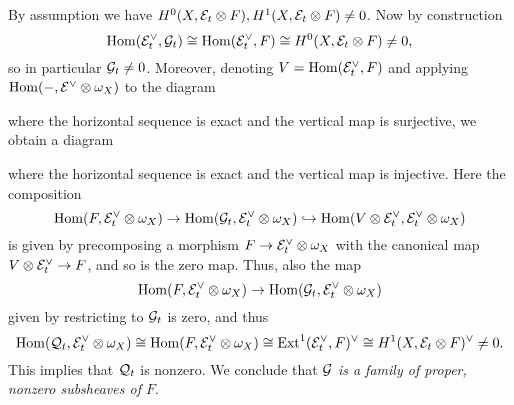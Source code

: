 \documentclass[letterpaper,10pt]{article}
\theoremstyle{remark}
\begin{document}
By assumption we have $H^0(X, \mathcal{E}_t \otimes F), H^1(X, \mathcal{E}_t \otimes F) \neq 0$. Now by construction
\[ \mathrm{Hom}(\mathcal{E}_t^\vee, \mathcal{G}_t) \cong \mathrm{Hom}(\mathcal{E}_t^\vee, F) \cong H^0(X, \mathcal{E}_t \otimes F) \neq 0, \]
so in particular $\mathcal{G}_t \neq 0$. Moreover, denoting $V = \mathrm{Hom}(\mathcal{E}_t^\vee, F)$ and applying $\mathrm{Hom}(-, \mathcal{E}^\vee \otimes \omega_X)$ to the diagram
\begin{center}
\end{center}
where the horizontal sequence is exact and the vertical map is surjective, we obtain a diagram
\begin{center}
\end{center}
where the horizontal sequence is exact and the vertical map is injective. Here the composition
\[ \mathrm{Hom}(F, \mathcal{E}_t^\vee \otimes \omega_X) \to \mathrm{Hom}(\mathcal{G}_t, \mathcal{E}_t^\vee \otimes \omega_X) \hookrightarrow \mathrm{Hom}(V \otimes \mathcal{E}_t^\vee, \mathcal{E}_t^\vee \otimes \omega_X) \]
is given by precomposing a morphism $F \to \mathcal{E}_t^\vee \otimes \omega_X$ with the canonical map $V \otimes \mathcal{E}_t^\vee \to F$, and so is the zero map. Thus, also the map
\[ \mathrm{Hom}(F, \mathcal{E}_t^\vee \otimes \omega_X) \to \mathrm{Hom}(\mathcal{G}_t, \mathcal{E}_t^\vee \otimes \omega_X) \]
given by restricting to $\mathcal{G}_t$ is zero, and thus 
\[ \mathrm{Hom}(\mathcal{Q}_t, \mathcal{E}_t^\vee \otimes \omega_X) \cong \mathrm{Hom}(F, \mathcal{E}_t^\vee \otimes \omega_X) \cong \mathrm{Ext}^1(\mathcal{E}_t^\vee, F)^\vee \cong H^1(X, \mathcal{E}_t \otimes F)^\vee \neq 0. \]
This implies that $\mathcal{Q}_t$ is nonzero. We conclude that \emph{$\mathcal{G}$ is a family of proper, nonzero subsheaves of $F$}.
\end{document}
